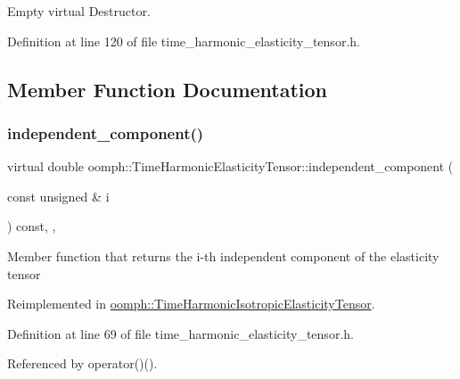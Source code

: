 Empty virtual Destructor. 



Definition at line 120 of file time\+\_\+harmonic\+\_\+elasticity\+\_\+tensor.\+h.



\subsection{Member Function Documentation}
\mbox{\label{classoomph_1_1TimeHarmonicElasticityTensor_a23ac2beedc3d47b22876faaacc0e27a0}} 
\subsubsection{\texorpdfstring{independent\+\_\+component()}{independent\_component()}}
{\footnotesize\ttfamily virtual double oomph\+::\+Time\+Harmonic\+Elasticity\+Tensor\+::independent\+\_\+component (\begin{DoxyParamCaption}\item[{const unsigned \&}]{i }\end{DoxyParamCaption}) const\hspace{0.3cm}{\ttfamily [inline]}, {\ttfamily [protected]}, {\ttfamily [virtual]}}

Member function that returns the i-\/th independent component of the elasticity tensor 

Reimplemented in \hyperlink{classoomph_1_1TimeHarmonicIsotropicElasticityTensor_a23e7e1a4c9ad0563378e613adce3c635}{oomph\+::\+Time\+Harmonic\+Isotropic\+Elasticity\+Tensor}.



Definition at line 69 of file time\+\_\+harmonic\+\_\+elasticity\+\_\+tensor.\+h.



Referenced by operator()().

\mbox{\label{classoomph_1_1TimeHarmonicElasticityTensor_a9af7ee0d97cb9308092795098b775b11}} 
